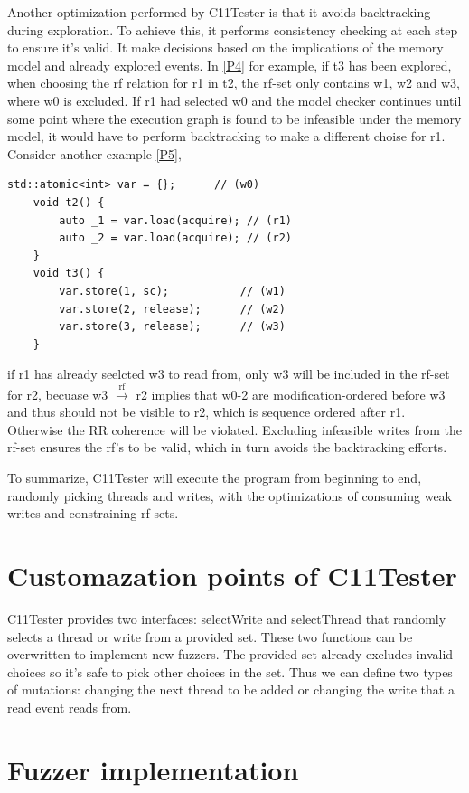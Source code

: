 Another optimization performed by C11Tester is that it avoids backtracking during exploration. To achieve this, it performs consistency checking at each step to ensure it's valid. It make decisions based on the implications of the memory model and already explored events. In \ref{P4} for example, if t3 has been explored, when choosing the rf relation for r1 in t2, the rf-set only contains w1, w2 and w3, where w0 is excluded. If r1 had selected w0 and the model checker continues until some point where the execution graph is found to be infeasible under the memory model, it would have to perform backtracking to make a different choise for r1. Consider another example \ref{P5},
\begin{lstlisting}[caption={P5}, label={P5}]
    std::atomic<int> var = {};      // (w0)
    void t2() {
        auto _1 = var.load(acquire); // (r1)
        auto _2 = var.load(acquire); // (r2)
    }
    void t3() {
        var.store(1, sc);           // (w1)
        var.store(2, release);      // (w2)
        var.store(3, release);      // (w3)
    }
\end{lstlisting}
if r1 has already seelcted w3 to read from, only w3 will be included in the rf-set for r2, becuase w3 $\xrightarrow{\text{rf}}$ r2 implies that w0-2 are modification-ordered before w3 and thus should not be visible to r2, which is sequence ordered after r1. Otherwise the RR coherence will be violated. Excluding infeasible writes from the rf-set ensures the rf's to be valid, which in turn avoids the backtracking efforts.

To summarize, C11Tester will execute the program from beginning to end, randomly picking threads and writes, with the optimizations of consuming weak writes and constraining rf-sets.


\section{Customazation points of C11Tester}

C11Tester provides two interfaces: selectWrite and selectThread that randomly selects a thread or write from a provided set. These two functions can be overwritten to implement new fuzzers. The provided set already excludes invalid choices so it's safe to pick other choices in the set. Thus we can define two types of mutations: changing the next thread to be added or changing the write that a read event reads from.

\section{Fuzzer implementation}

